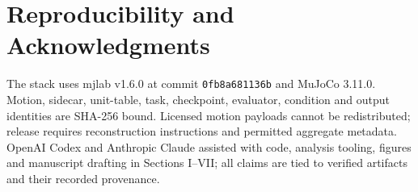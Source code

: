 \documentclass[letterpaper,10pt,conference]{ieeeconf}
\begin{document}
\section*{Reproducibility and Acknowledgments}
The stack uses mjlab v1.6.0 at commit \texttt{0fb8a681136b} and MuJoCo 3.11.0.
Motion, sidecar, unit-table, task, checkpoint, evaluator, condition and output identities
are SHA-256 bound. Licensed motion payloads cannot be redistributed; release requires
reconstruction instructions and permitted aggregate metadata. OpenAI Codex and
Anthropic Claude assisted with code, analysis tooling, figures and manuscript drafting
in Sections I--VII; all claims are tied to verified artifacts and their recorded
provenance.



\end{document}
